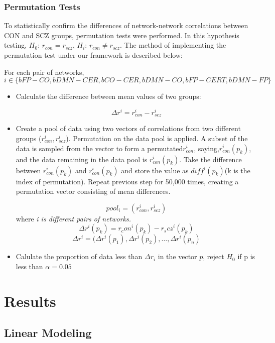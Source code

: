 \documentclass[11pt]{article}
\begin{document}
\subsubsection{Permutation Tests}

To statistically confirm the differences of network-network correlations between CON and SCZ groups, permutation tests were performed. In this hypothesis testing, $H_{0}$: $r_{con} = r_{scz}$, $H_{i}$: $r_{con} \neq r_{scz}$.
The method of implementing the permutation test under our framework is described below:

For each pair of networks, $$i \in \{ bFP-CO, bDMN-CER, bCO-CER, bDMN-CO, bFP-CERT, bDMN-FP \}$$ 
\begin{itemize}
\item Calculate the difference between mean values of two groups:

$$ \Delta r^i =  r_{con}^i - r_{scz}^i $$ 

\item  Create a pool of data using two vectors of correlations from two different groups ($r_{con}^i, r_{scz}^i$). Permutation on the data pool is applied. A subset of the data is sampled from the vector to form a permutated$ r_{con}^i$, saying,$ r_{con}^i(p_k)$, and the data remaining in the data pool is $r_{con}^i(p_k)$. Take the difference between $ r_{con}^i(p_k)$ and  $r_{con}^i(p_k)$ and store the value as $diff^i(p_k)$(k is the index of permutation). Repeat previous step for 50,000 times, creating a permutation vector consisting of mean differences.

$$ pool_{i} = (r_{con}^i, r_{scz}^i) $$ where \textit{ i is different pairs of networks.}
$$ \Delta r^i(p_k) = r_con^i(p_k) - r_scz^i(p_k) $$ 
$$ \Delta r^i = (\Delta r^i(p_1), \Delta r^i(p_2), \dots, \Delta r^i(p_n) $$

\item Calulate the proportion of data less than $\Delta r_i$ in the vector $p$, reject $H_0$ if p is less than $\alpha = 0.05$

\end{itemize}


\section{Results}

\subsection{Linear Modeling}
\end{document}
